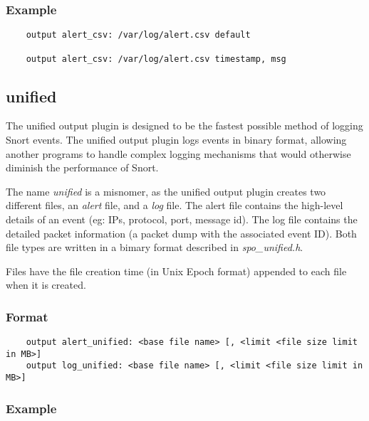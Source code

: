 \documentclass[english]{report}
\newenvironment{note}{
\samepage
    \vspace{10pt}{\textsf{
        {\hspace{7pt}\Huge{$\triangle$\hspace{-12.5pt}{\Large{$^!$}}}}\hspace{5pt}
        {\Large{NOTE}}
    }
    }
   \begin{center}
    \par\vspace{-17pt}

    \begin{lrbox}{\savepar}
    \begin{minipage}[r]{6in}
}
{
    \end{minipage}
    \end{lrbox}
    \fbox{
        \usebox{
            \savepar
	}
    }
    \par\vskip10pt
    \end{center}
}
\newenvironment{note}{
        \begin{rawhtml}
        <p><table border="1"><tr><td><b>
        Note:&nbsp;&nbsp;</b>
        \end{rawhtml}
}{
        \begin{rawhtml}
        </b></td></tr></table></p>
        \end{rawhtml}
}
\begin{document}
\subsubsection{Example}

\begin{verbatim}
    output alert_csv: /var/log/alert.csv default

    output alert_csv: /var/log/alert.csv timestamp, msg
\end{verbatim}

\subsection{unified}
\label{unified}

The unified output plugin is designed to be the fastest possible method of
logging Snort events.  The unified output plugin logs events in binary format,
allowing another programs to handle complex logging mechanisms that would
otherwise diminish the performance of Snort.

The name \emph{unified} is a misnomer, as the unified output plugin creates two
different files, an \emph{alert} file, and a \emph{log} file.   The alert file
contains the high-level details of an event (eg: IPs, protocol, port, message
id).  The log file contains the detailed packet information (a packet dump with
the associated event ID).  Both file types are written in a bimary format
described in \emph{spo\_unified.h}.

\begin{note}

Files have the file creation time (in Unix Epoch format) appended to each file
when it is created.

\end{note}

\subsubsection{Format}

\begin{verbatim}
    output alert_unified: <base file name> [, <limit <file size limit in MB>]
    output log_unified: <base file name> [, <limit <file size limit in MB>]
\end{verbatim}

\subsubsection{Example}
\end{document}
